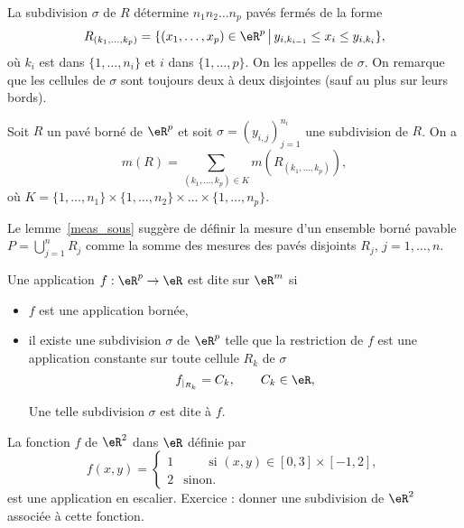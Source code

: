 La subdivision $\sigma$ de $R$ détermine $n_1n_2\ldots n_p$ pavés fermés de la forme
\[
R_{(k_1,\ldots,k_p)}=\{(x_1,\ldots, x_p)\in\eR^p\,\big\vert\, y_{i,k_{i-1}}\leq x_i\leq y_{i,k_i}\},
\]
où $k_i$ est dans $\{1,\ldots, n_i\}$ et $i$ dans $\{1,\ldots, p\}$. On les appelles  de $\sigma$. On remarque que les cellules de $\sigma$ sont toujours deux à deux disjointes (sauf au plus sur leurs bords).
\begin{lemma}\label{meas_sous}
	Soit $R$ un pavé borné de $\eR^p$ et soit $\sigma=(y_{i,j})_{j=1}^{n_i}$ une subdivision de $R$.
On a
\[
m(R)=\sum_{(k_1,\ldots,k_p)\in K} m(R_{(k_1,\ldots,k_p)}),
\]
où $K=\{1,\ldots,n_1\}\times\{1,\ldots,n_2\}\times\ldots \times\{1,\ldots,n_p\}$.
\end{lemma}
Le lemme~\ref{meas_sous} suggère de définir la mesure d'un ensemble borné pavable $P=\bigcup_{j=1}^{n}R_j$ comme la somme des mesures des pavés disjoints $R_j$, $j=1,\ldots, n$.
\begin{definition}
Une application $f:\eR^p\to\eR$ est dite  sur $\eR^m$ si
  \begin{itemize}
  \item $f$ est une application bornée,
\item il existe une subdivision $\sigma$ de $\eR^p$ telle que la restriction de $f$  est une application constante sur toute cellule $R_k$ de $\sigma$
\[
f_{\vert_{R_k}}=C_k, \qquad C_k\in\eR,
\]

Une telle subdivision $\sigma$ est dite  à $f$.
  \end{itemize}
\end{definition}
\begin{example}
  La fonction $f$ de $\eR^2$ dans $\eR$ définie par
  \begin{equation}
    f(x,y)=\left\{
    \begin{array}{ll}
      1&\qquad \textrm{si } (x,y) \in [0,3]\times[-1,2],\\
2 &\textrm{sinon.}
    \end{array}\right.
  \end{equation}
est une application en escalier. Exercice : donner une subdivision de $\eR^2$ associée à cette fonction.
\end{example}

